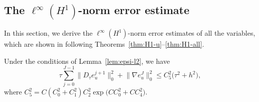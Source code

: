 \subsection{The \texorpdfstring{$\ell^{\infty}(H^{1})$}{l-inf(H1)}-norm error estimate}

In this section, we derive the $\ell^{\infty}(H^{1})$-norm error estimates of all the variables,
which are shown in following Theorems~\ref{thm:H1-u}--\ref{thm:H1-all}.

\begin{theorem}\label{thm:H1-u}
Under the conditions of Lemma~\ref{lem:epsi-l2}, we have
\begin{equation}\label{eq:H1-u}
  \tau\sum_{j=0}^{J-1}\bigl\|D_{\tau}e_{u}^{j+1}\bigr\|_{0}^{2}
  + \bigl\|\nabla e_{u}^{J}\bigr\|_{0}^{2}
  \leq C_{5}^{2}\bigl(\tau^{2} + h^{2}\bigr),
\end{equation}
where $C_{5}^{2} = C(C_{0}^{2}+C_{1}^{2})C_{2}^{2}\exp\!\bigl(CC_{0}^{2}+CC_{4}^{2}\bigr)$.
\end{theorem}

